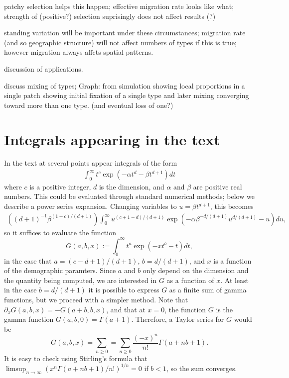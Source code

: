 \documentclass{article}
\begin{document}
{patchy selection helps this happen; 
effective migration rate looks like what; 
strength of (positive?) selection suprisingly does not affect results (?) 

standing variation will be important under these circumstances; 
migration rate (and so geographic structure) will not affect numbers of types if this is true; 
however migration always affcts spatial patterns. 

discussion of applications. 

discuss mixing of types; 
Graph: from simulation showing local proportions in a single patch showing initial fixation of a single type and later mixing converging toward more than one type.  (and eventual loss of one?)



\appendix

\section{Integrals appearing in the text}
    \label{apx:integrals}

In the text at several points appear integrals of the form
\begin{align}
  \int_0^\infty t^c \exp \left( - \alpha t^d - \beta t^{d+1} \right) dt 
\end{align}
where $c$ is a positive integer, $d$ is the dimension, and $\alpha$ and $\beta$ are positive real numbers.
This could be evaluated through standard numerical methods; below we describe a power series expansion.
Changing variables to $u = \beta t^{d+1}$, this becomes
\begin{align}
    \left( (d+1)^{-1} \beta^{ (1-c)/(d+1) } \right) \int_0^\infty u^{(c+1-d)/(d+1)} \exp\left( - \alpha \beta^{-d/(d+1)} u^{d/(d+1)} - u \right) du ,
\end{align}
so it suffices to evaluate the function
\begin{equation}
    G(a,b,x) := \int_0^\infty  t^a \exp\left( -x t^b - t \right) dt ,
\end{equation}
in the case that $a=(c-d+1)/(d+1)$, $b=d/(d+1)$, and $x$ is a function of the demographic paramters.
Since $a$ and $b$ only depend on the dimension and the quantity being computed,
we are interested in $G$ as a function of $x$.
At least in the case $b=d/(d+1)$ it is possible to express $G$ as a finite sum of gamma functions,
but we proceed with a simpler method.
Note that $\partial_x G(a,b,x) = -G(a+b,b,x)$,
and that at $x=0$, the function $G$ is the gamma function $G(a,b,0) = \Gamma(a+1)$.
Therefore, a Taylor series for $G$ would be
\[
    G(a,b,x) = \sum_{n \ge 0} = \sum_{n \ge 0} \frac{(-x)^n}{n!} \Gamma(a+nb+1) .
\]
It is easy to check using Stirling's formula that $\limsup_{n \to \infty} ( x^n \Gamma(a+nb+1)/n! )^{1/n} = 0$
if $b<1$, so the sum converges.


}
\end{document}
